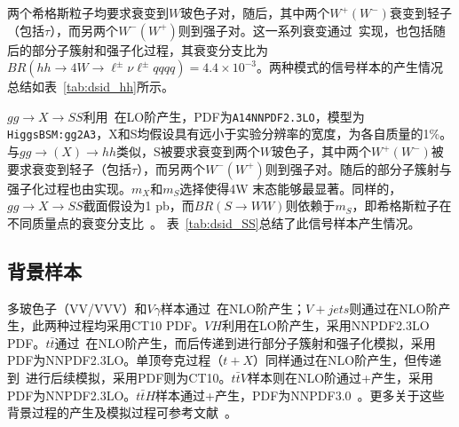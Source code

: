 两个希格斯粒子均要求衰变到$W$玻色子对，随后，其中两个$W^{+}(W^{-})$衰变到轻子（包括$\tau$），而另两个$W^{-}(W^{+})$则到强子对。这一系列衰变通过\Herwigpp~\cite{herwigpp}实现，也包括随后的部分子簇射和强子化过程，其衰变分支比为$BR(hh\rightarrow 4W \rightarrow \ell^{\pm}\nu\ell^{\pm}qqqq)=4.4\times10^{-3}$。两种模式的信号样本的产生情况总结如表~\ref{tab:dsid_hh}所示。


$gg \rightarrow X \rightarrow SS$利用~\cite{pythia8}在LO阶产生，PDF为\texttt{A14NNPDF2.3LO}，模型为\texttt{HiggsBSM:gg2A3}，X和S均假设具有远小于实验分辨率的宽度，为各自质量的1\%。与$gg\rightarrow (X) \rightarrow hh$类似，S被要求衰变到两个$W$玻色子，其中两个$W^{+}(W^{-})$被要求衰变到轻子（包括$\tau$），而另两个$W^{-}(W^{+})$则到强子对。随后的部分子簇射与强子化过程也由实现。$m_X$和$m_S$选择使得4W 末态能够最显著。同样的，$gg \rightarrow X \rightarrow SS$截面假设为1 pb，而$BR(S\rightarrow WW)$则依赖于$m_S$，即希格斯粒子在不同质量点的衰变分支比~\cite{Denner:2011mq}。
表~\ref{tab:dsid_SS}总结了此信号样本产生情况。


\subsection{背景样本}
多玻色子（VV/VVV）和$V\gamma$样本通过~\cite{sherpa}在NLO阶产生；$V+jets$则通过在NLO阶产生，此两种过程均采用CT10 PDF。$VH$利用在LO阶产生，采用NNPDF2.3LO PDF。$t\bar{t}$通过~\cite{powhegbox}在NLO阶产生，而后传递到进行部分子簇射和强子化模拟，采用PDF为NNPDF2.3LO。单顶夸克过程（$t+X$）同样通过在NLO阶产生，但传递到~\cite{pythia6}进行后续模拟，采用PDF则为CT10。$t\bar{t}V$样本则在NLO阶通过\MGMCatNLO+产生，采用PDF为NNPDF2.3LO。$t\bar{t}H$样本通过\MGMCatNLO+\Herwigpp 产生，PDF为NNPDF3.0~\cite{PDF:NNPDF30}。更多关于这些背景过程的产生及模拟过程可参考文献~\cite{ATL-PHYS-PUB-2016-004,ATL-PHYS-PUB-2016-005,ATL-PHYS-PUB-2016-002}。

